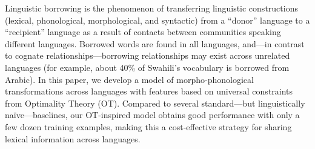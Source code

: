 Linguistic borrowing is the phenomenon of transferring linguistic constructions (lexical, phonological, morphological, and syntactic) from a ``donor'' language to a ``recipient'' language as a result of contacts between communities speaking different languages. Borrowed words are found in all languages, and—in contrast to cognate relationships—borrowing relationships may exist across unrelated languages (for example, about 40\% of Swahili's vocabulary is borrowed from Arabic). In this paper, we develop a model of morpho-phonological transformations across languages with features based on universal constraints from Optimality Theory (OT). Compared to several standard—but linguistically naïve—baselines, our OT-inspired model obtains good performance with only a few dozen training examples, making this a cost-effective strategy for sharing lexical information across languages.
